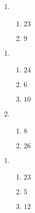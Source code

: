 \documentclass[12pt,twoside]{article}
\makeatletter
\def\emptycleardoublepage{\clearpage\if@twoside \ifodd\c@page\else
\thispagestyle{empty}%
\hbox{}\newpage\if@twocolumn\hbox{}\newpage\fi\fi\fi}
\makeatother
\begin{document}
\begin{multicols}{2}
\begin{enumerate}
\item \begin{enumerate}
\def \a{6}\def \b{17}\def \apb{23}
\item $\apb$
\def \a{3}\def \b{6}\def \ab{9}
\item $\ab$
\def \vshift{-1}\def \hshift{4}\def \chang{-2}\def \findval{2}\def \yval{3}
\end{enumerate}
\end{enumerate}\end{multicols}\emptycleardoublepage{}\graphicspath{{/Users/jilan/Downloads/Randomizer/Randomizer/Sample Course/Sample Assessment 2/}}\begin{multicols}{2} \begin{enumerate}
\item \begin{enumerate}
\def \a{7}\def \b{17}\def \apb{24}
\item $\apb$
\def \a{10}\def \dif{6}\def \b{4}
\item $\dif$
\def \a{4}\def \b{6}\def \ab{10}
\item $\ab$
\def \vshift{3}\def \hshift{2}\def \chang{-1}\def \findval{1}\def \yval{5}
\end{enumerate}

\item \begin{enumerate}
\def \a{2}\def \b{6}\def \ab{8}
\item $\ab$
\def \a{8}\def \b{18}\def \apb{26}
\item $\apb$
\def \vshift{-5}\def \hshift{2}\def \chang{0}\def \findval{2}\def \yval{-5}
\end{enumerate}
\end{enumerate}\end{multicols}\emptycleardoublepage{}\graphicspath{{/Users/jilan/Downloads/Randomizer/Randomizer/Sample Course/Sample Assessment 2/}}\begin{multicols}{2} \begin{enumerate}
\item \begin{enumerate}
\def \a{7}\def \b{16}\def \apb{23}
\item $\apb$
\def \a{11}\def \dif{5}\def \b{6}
\item $\dif$
\def \a{4}\def \b{8}\def \ab{12}
\item $\ab$
\def \vshift{-1}\def \hshift{-2}\def \chang{1}\def \findval{-1}\def \yval{-3}
\end{enumerate}


\end{enumerate}
\end{multicols}
\end{document}
